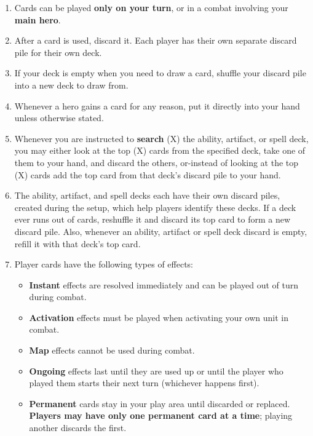\begin{enumerate}
  \item Cards can be played \textbf{only on your turn}, or in a combat involving your \textbf{main hero}.
  \item After a card is used, discard it. Each player has their own separate discard pile for their own deck.
  \item If your deck is empty when you need to draw a card, shuffle your discard pile into a new deck to draw from.
  \item Whenever a hero gains a card for any reason, put it directly into your hand unless otherwise stated.
  \item Whenever you are instructed to \textbf{search} (X) the ability, artifact, or spell deck, you may either look at the top (X) cards from the specified deck, take one of them to your hand, and discard the others, or-instead of looking at the top (X) cards add the top card from that deck’s discard pile to your hand.
  \item The ability, artifact, and spell decks each have their own discard piles, created during the setup, which help players identify these decks. If a deck ever runs out of cards, reshuffle it and discard its top card to form a new discard pile. Also, whenever an ability, artifact or spell deck discard is empty, refill it with that deck’s top card.
  \item Player cards have the following types of effects:
  \begin{itemize}
        \item \textbf{Instant}  effects are resolved immediately and can be played out of turn during combat.
        \item \textbf{Activation}  effects must be played when activating your own unit in combat.
        \item \textbf{Map}  effects cannot be used during combat.
        \item \textbf{Ongoing}  effects last until they are used up or until the player who played them starts their next turn (whichever happens first).
        \item \textbf{Permanent}  cards stay in your play area until discarded or replaced. \textbf{Players may have only one permanent card at a time}; playing another discards the first.
    \end{itemize}

\end{enumerate}

